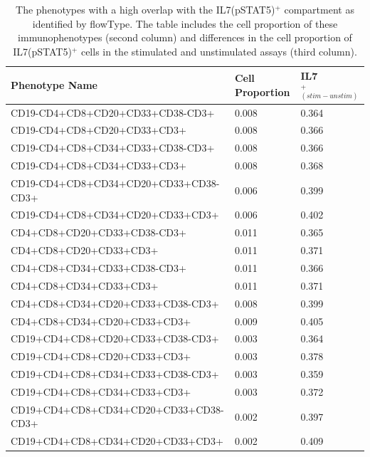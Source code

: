 \begin{table}[ht]\footnotesize
  \begin{center}
    \caption{The phenotypes with a high overlap with the IL7(pSTAT5)$^+$ compartment as identified by flowType. The table includes the cell proportion of these immunophenotypes (second column) and differences in the cell proportion of IL7(pSTAT5)$^+$ cells in the stimulated and unstimulated assays (third column).}
    \label{IL7}
    \begin{tabular}{lll}
      \hline
      Phenotype Name & Cell Proportion & IL7$^+_{(stim-unstim)}$ \\ 
      \hline
        CD19-CD4+CD8+CD20+CD33+CD38-CD3+ & 0.008 & 0.364 \\ 
        CD19-CD4+CD8+CD20+CD33+CD3+ & 0.008 & 0.366 \\ 
        CD19-CD4+CD8+CD34+CD33+CD38-CD3+ & 0.008 & 0.366 \\ 
        CD19-CD4+CD8+CD34+CD33+CD3+ & 0.008 & 0.368 \\ 
        CD19-CD4+CD8+CD34+CD20+CD33+CD38-CD3+ & 0.006 & 0.399 \\ 
        CD19-CD4+CD8+CD34+CD20+CD33+CD3+ & 0.006 & 0.402 \\ 
        CD4+CD8+CD20+CD33+CD38-CD3+ & 0.011 & 0.365 \\ 
        CD4+CD8+CD20+CD33+CD3+ & 0.011 & 0.371 \\ 
        CD4+CD8+CD34+CD33+CD38-CD3+ & 0.011 & 0.366 \\ 
        CD4+CD8+CD34+CD33+CD3+ & 0.011 & 0.371 \\ 
        CD4+CD8+CD34+CD20+CD33+CD38-CD3+ & 0.008 & 0.399 \\ 
        CD4+CD8+CD34+CD20+CD33+CD3+ & 0.009 & 0.405 \\ 
        CD19+CD4+CD8+CD20+CD33+CD38-CD3+ & 0.003 & 0.364 \\ 
        CD19+CD4+CD8+CD20+CD33+CD3+ & 0.003 & 0.378 \\ 
        CD19+CD4+CD8+CD34+CD33+CD38-CD3+ & 0.003 & 0.359 \\ 
        CD19+CD4+CD8+CD34+CD33+CD3+ & 0.003 & 0.372 \\ 
        CD19+CD4+CD8+CD34+CD20+CD33+CD38-CD3+ & 0.002 & 0.397 \\ 
        CD19+CD4+CD8+CD34+CD20+CD33+CD3+ & 0.002 & 0.409 \\ 
      \hline
    \end{tabular}
  \end{center}
\end{table}


